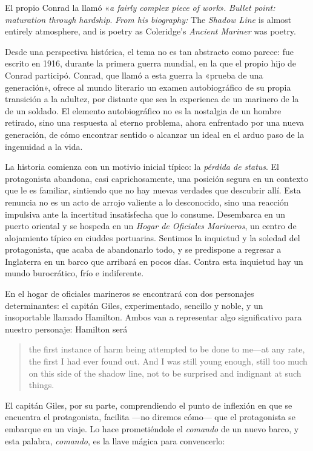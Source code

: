 \documentclass[a4paper, 12pt]{article}
\begin{document}
El propio Conrad la llamó «\textit{a fairly complex piece of work}».
\textit{Bullet point: maturation through hardship}. \textit{From his biography:}
The \textit{Shadow Line} is almost entirely atmosphere, and is poetry as
Coleridge's \textit{Ancient Mariner} was poetry.

Desde una perspectiva histórica, el tema no es tan abstracto como parece: fue
escrito en 1916, durante la primera guerra mundial, en la que el propio hijo de
Conrad participó. Conrad, que llamó a esta guerra la «prueba de una generación»,
ofrece al mundo literario un examen autobiográfico de su propia transición a la
adultez, por distante que sea la experienca de un marinero de la de un soldado.
El elemento autobiográfico no es la nostalgia de un hombre retirado, sino una
respuesta al eterno problema, ahora enfrentado por una nueva generación, de cómo
encontrar sentido o alcanzar un ideal en el arduo paso de la ingenuidad a la
vida. 

La historia comienza con un motivio inicial típico: la \textit{pérdida de
status}. El protagonista abandona, casi caprichosamente, una posición segura en
un contexto que le es familiar, sintiendo que no hay nuevas verdades que
descubrir allí. Esta renuncia no es un acto de arrojo valiente a lo desconocido,
sino una reacción impulsiva ante la incertitud insatisfecha que lo consume.
Desembarca en un puerto oriental y se hospeda en un \textit{Hogar de Oficiales
Marineros}, un centro de alojamiento típico en ciuddes portuarias. Sentimos la
inquietud y la soledad del protagonista, que acaba de abandonarlo todo, y se
predispone a regresar a Inglaterra en un barco que arribará en pocos días.
Contra esta inquietud hay un mundo burocrático, frío e indiferente. 

En el hogar de oficiales marineros se encontrará con dos personajes
determinantes: el capitán Giles, experimentado, sencillo y noble, y un
insoportable llamado Hamilton. Ambos van a representar algo significativo para
nuestro personaje: Hamilton será 

\begin{quote}
the first instance of harm being attempted to be done to me—at any rate,
the first I had ever found out. And I was still young enough, still too much on
this side of the shadow line, not to be surprised and indignant at such things.
\end{quote}

El capitán Giles, por su parte, comprendiendo el punto de inflexión en que se
encuentra el protagonista, facilita ---no diremos cómo--- que el protagonista se
embarque en un viaje. Lo hace prometiéndole el \textit{comando} de un nuevo
barco, y esta palabra, \textit{comando}, es la llave mágica para convencerlo:
\end{document}
